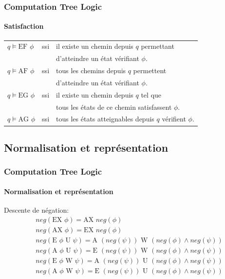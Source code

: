 \documentclass[11pt]{beamer}
\begin{document}
\begin{frame}
    \frametitle{Computation Tree Logic}
    \framesubtitle{Satisfaction}

    \begin{tabular}{lcl}
    $q \vDash \mbox{EF } \phi$ & ssi & il existe un chemin depuis $q$ permettant \\&& d'atteindre un état vérifiant $\phi$. \\
    $q \vDash \mbox{AF } \phi$ & ssi & tous les chemins depuis $q$ permettent \\&&d'atteindre un état vérifiant $\phi$. \\
    $q \vDash \mbox{EG } \phi$ & ssi & il existe un chemin depuis $q$ tel que \\&&tous les états de ce chemin satisfassent $\phi$.\\
    $q \vDash \mbox{AG } \phi$ & ssi & tous les états atteignables depuis $q$ vérifient $\phi$.\\
    \end{tabular}
\end{frame}

\subsection{Normalisation et représentation}
\begin{frame}
    \frametitle{Computation Tree Logic}
    \framesubtitle{Normalisation et représentation}

    Descente de négation:
    \begin{align*}
    &neg(\mbox{EX } \phi) = \mbox{AX }neg(\phi)\\
    &neg(\mbox{AX } \phi) = \mbox{EX }neg(\phi)\\
    &neg(\mbox{E } \phi \mbox{ U } \psi) =\mbox{A } (neg(\psi)) \mbox{ W } (neg(\phi) \land neg(\psi))\\
    &neg(\mbox{A } \phi \mbox{ U } \psi) =\mbox{E } (neg(\psi)) \mbox{ W } (neg(\phi) \land neg(\psi))\\
    &neg(\mbox{E } \phi \mbox{ W } \psi) =\mbox{A } (neg(\psi)) \mbox{ U } (neg(\phi) \land neg(\psi))\\
    &neg(\mbox{A } \phi \mbox{ W } \psi) =\mbox{E } (neg(\psi)) \mbox{ U } (neg(\phi) \land neg(\psi))
    \end{align*}

\end{frame}
\end{document}
